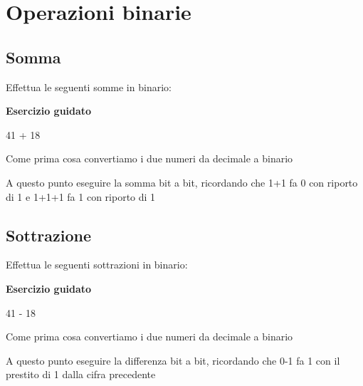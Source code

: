 \documentclass[11pt,fleqn]{book}
\begin{document}

\chapter{Operazioni binarie}

\section{Somma}

Effettua le seguenti somme in binario:

\begin{esercizio}[1]
    \textbf{Esercizio guidato}

    41 + 18

    Come prima cosa convertiamo i due numeri da decimale a binario

    \immediate{}
    

    \immediate{}
    

    A questo punto eseguire la somma bit a bit, ricordando che 1+1 fa 0 con riporto di 1 e 1+1+1 fa 1 con riporto di 1

    \immediate{}
    

\end{esercizio}

\newpage


\section{Sottrazione}

Effettua le seguenti sottrazioni in binario:

\begin{esercizio}[1]
    \textbf{Esercizio guidato}

    41 - 18

    Come prima cosa convertiamo i due numeri da decimale a binario

    \immediate{}
    

    \immediate{}
    

    A questo punto eseguire la differenza bit a bit, ricordando che 0-1 fa 1 con il prestito di 1 dalla cifra precedente

    \immediate{}
    

\end{esercizio}
\end{document}
